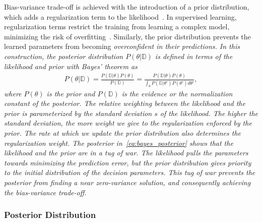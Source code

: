 %
Bias-variance trade-off is achieved with the introduction of a prior
distribution, which adds a regularization term to the
likelihood~\cite{bishop2006pattern}.
%
In supervised learning, regularization terms restrict the training from learning
a complex model, minimizing the risk of overfitting~\cite{santos2022avoiding}.
%
Similarly, the prior distribution prevents the learned parameters from becoming
\it{overconfident} \normalfont in their predictions.
%
In this construction, the posterior distribution $P(\theta | \mathbb{D})$ is
defined in terms of the likelihood and prior with Bayes' theorem as 
\begin{align}
  P(\theta | \mathbb{D}) = \frac{P(\mathbb{D} | \theta) P(\theta) }{P(\mathbb{D})}
  = \frac{P(\mathbb{D} | \theta) P(\theta) }{\int_\theta P(\mathbb{D} | \theta') P(\theta')  d\theta'}, 
  \label{eq:bayes_posterior}
\end{align}
where  $P(\theta)$ is the prior and $P(\mathbb{D})$ is the evidence or the
normalization constant of the posterior.
%
The relative weighting between the likelihood and the prior is parameterized by
the standard deviation $s$ of the likelihood. The higher the standard deviation,
the more weight we give to the regularization enforced by the prior.
%
The rate at which we update the prior distribution also determines the
regularization weight.
%
The posterior in~\eqref{eq:bayes_posterior} shows that the likelihood and the
prior are in a tug of war. The likelihood pulls the parameters towards
minimizing the prediction error, but the prior distribution gives priority to the
initial distribution of the decision parameters.
%
This tug of war prevents the posterior from finding a near zero-variance
solution, and consequently achieving the bias-variance trade-off.

\subsubsection{Posterior Distribution}

